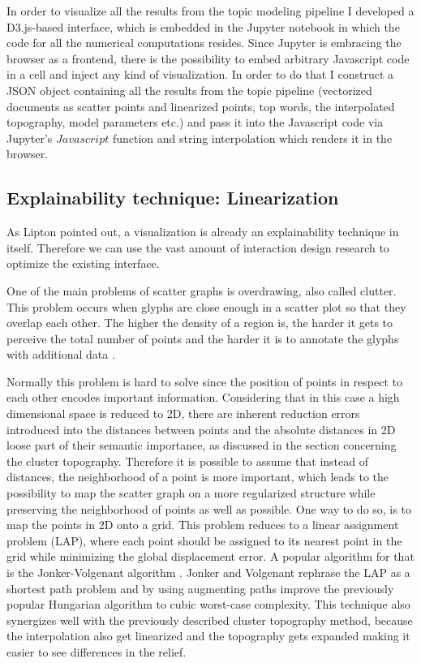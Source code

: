 In order to visualize all the results from the topic modeling pipeline I developed a D3.js-based interface, which is embedded in the Jupyter notebook in which the code for all the numerical computations resides. Since Jupyter is embracing the browser as a frontend, there is the possibility to embed arbitrary Javascript code in a cell and inject any kind of visualization. In order to do that I construct a JSON object containing all the results from the topic pipeline (vectorized documents as scatter points and linearized points, top words, the interpolated topography, model parameters etc.) and pass it into the Javascript code via Jupyter's $Javascript$ function and string interpolation which renders it in the browser.

\subsection{Explainability technique: Linearization}

As Lipton \cite{liptonMythosModelInterpretability2016a} pointed out, a visualization is already an explainability technique in itself. Therefore we can use the vast amount of interaction design research to optimize the existing interface. 

One of the main problems of scatter graphs is overdrawing, also called clutter. This problem occurs when glyphs are close enough in a scatter plot so that they overlap each other. The higher the density of a region is, the harder it gets to perceive the total number of points and the harder it is to annotate the glyphs with additional data \cite{mayorgaSplatterplotsOvercomingOverdraw2013}. 

Normally this problem is hard to solve since the position of points in respect to each other encodes important information. Considering that in this case a high dimensional space is reduced to 2D, there are inherent reduction errors introduced into the distances between points and the absolute distances in 2D loose part of their semantic importance, as discussed in the section concerning the cluster topography. Therefore it is possible to assume that instead of distances, the neighborhood of a point is more important, which leads to the possibility to map the scatter graph on a more regularized structure while preserving the neighborhood of points as well as possible. One way to do so, is to map the points in 2D onto a grid. This problem reduces to a linear assignment problem (LAP), where each point should be assigned to its nearest point in the grid while minimizing the global displacement error. A popular algorithm for that is the Jonker-Volgenant algorithm \cite{jonkerShortestAugmentingPath1987}. Jonker and Volgenant rephrase the LAP as a shortest path problem and by using augmenting paths improve the previously popular Hungarian algorithm to cubic worst-case complexity. This technique also synergizes well with the previously described cluster topography method, because the interpolation also get linearized and the topography gets expanded making it easier to see differences in the relief.